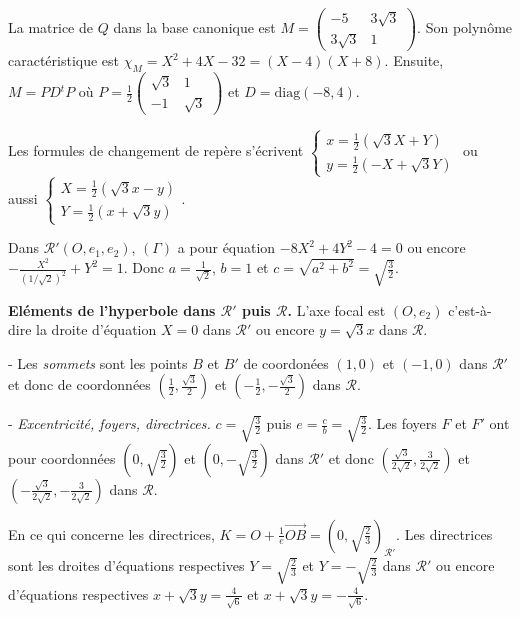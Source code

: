 {\begin{enumerate}
{La matrice de $Q$ dans la base canonique est $M=\left(
\begin{array}{cc}
-5&3\sqrt{3}\\
3\sqrt{3}&1
\end{array}
\right)$. Son polynôme caractéristique est $\chi_M=X^2+4X-32 = (X-4)(X+8)$. Ensuite, $M = PD{^t}P $ où $P=\frac{1}{2}\left(
\begin{array}{cc}
\sqrt{3}&1\\
-1&\sqrt{3}
\end{array}
\right)$ et $D =\text{diag}(-8,4)$.

Les formules de changement de repère s'écrivent $\left\{
\begin{array}{l}
x=\frac{1}{2}(\sqrt{3}X+Y)\\
y=\frac{1}{2}(-X+\sqrt{3}Y)
\end{array}
\right.$ ou aussi $\left\{
\begin{array}{l}
X=\frac{1}{2}(\sqrt{3}x-y)\\
Y=\frac{1}{2}(x+\sqrt{3}y)
\end{array}
\right.$.

Dans $\mathcal{R}'(O,e_1,e_2)$, $(\Gamma)$ a pour équation $-8X^2+4Y^2-4=0$ ou encore $-\frac{X^2}{(1/\sqrt{2})^2}+Y^2 = 1$. Donc $a=\frac{1}{\sqrt{2}}$, $b=1$ et $c=\sqrt{a^2+b^2}=\sqrt{\frac{3}{2}}$. 

\textbf{Eléments de l'hyperbole dans $\mathcal{R}'$ puis $\mathcal{R}$.} L'axe focal est $(O,e_2)$ c'est-à-dire la droite d'équation $X=0$ dans $\mathcal{R}'$ ou encore $y=\sqrt{3}x$ dans $\mathcal{R}$.

- Les \emph{sommets} sont les points $B$ et $B'$ de coordonées $(1,0)$ et $(-1,0)$ dans $\mathcal{R}'$ et donc de coordonnées $\left(\frac {1}{2},\frac{\sqrt{3}}{2}\right)$ et $\left(-\frac {1}{2},-\frac{\sqrt{3}}{2}\right)$ dans $\mathcal{R}$.

- \emph{Excentricité, foyers, directrices.} $c=\sqrt{\frac{3}{2}}$ puis $e=\frac{c}{b}=\sqrt{\frac{3}{2}}$. Les foyers $F$ et $F'$ ont pour coordonnées $\left(0,\sqrt{\frac{3}{2}}\right)$ et  $\left(0,-\sqrt{\frac{3}{2}}\right)$ dans $\mathcal{R}'$ et donc $\left(\frac{\sqrt{3}}{2\sqrt{2}},\frac{3}{2\sqrt{2}}\right)$ et  $\left(-\frac{\sqrt{3}}{2\sqrt{2}},-\frac{3}{2\sqrt{2}}\right)$ dans $\mathcal{R}$.

En ce qui concerne les directrices, $K=O +\frac{1}{e}\overrightarrow{OB}=\left(0,\sqrt{\frac{2}{3}}\right)_{\mathcal{R}'}$. Les directrices sont les droites d'équations respectives $Y=\sqrt{\frac{2}{3}}$ et $Y=-\sqrt{\frac{2}{3}}$ dans $\mathcal{R}'$ ou encore d'équations respectives $x+\sqrt{3}y=\frac{4}{\sqrt{6}}$ et $x+\sqrt{3}y=-\frac{4}{\sqrt{6}}$.

}
\end{enumerate}}
